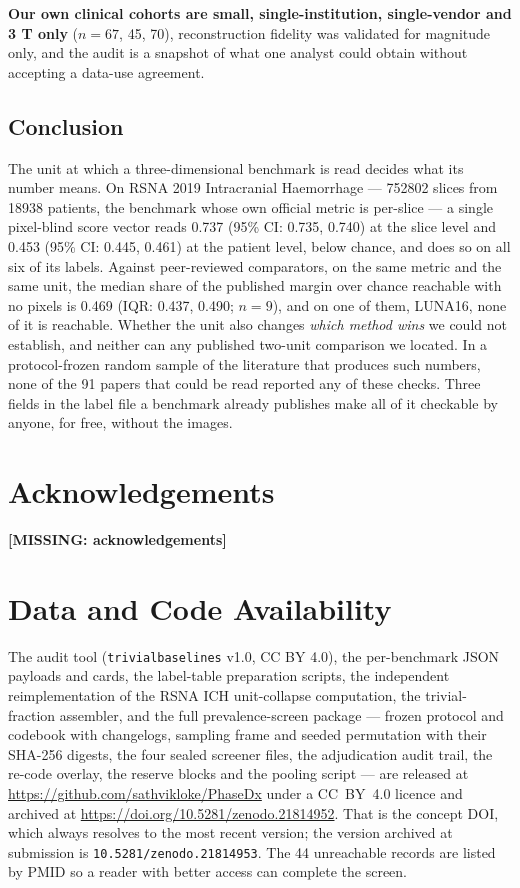 \documentclass[11pt,a4paper]{article}
\newcommand{\todo}[1]{\textbf{[#1]}}
\begin{document}
\textbf{Our own clinical cohorts are small, single-institution, single-vendor and
3 T only} ($n=67$, 45, 70), reconstruction fidelity was validated for magnitude
only, and the audit is a snapshot of what one analyst could obtain without
accepting a data-use agreement.

\subsection{Conclusion}

The unit at which a three-dimensional benchmark is read decides what its number
means. On RSNA 2019 Intracranial Haemorrhage --- \num{752802} slices from
\num{18938} patients, the benchmark whose own official metric is per-slice --- a
single pixel-blind score vector reads 0.737 (95\% CI: 0.735, 0.740) at the slice
level and 0.453 (95\% CI: 0.445, 0.461) at the patient level, below chance, and
does so on all six of its labels. Against peer-reviewed comparators, on the same
metric and the same unit, the median share of the published margin over chance
reachable with no pixels is 0.469 (IQR: 0.437, 0.490; $n=9$), and on one of them,
LUNA16, none of it is reachable. Whether the unit also changes \emph{which
method wins} we could not establish, and neither can any published two-unit
comparison we located. In a protocol-frozen random sample of the literature that
produces such numbers, none of the 91 papers that could be read reported any of
these checks. Three fields in the label file a benchmark already publishes make
all of it checkable by anyone, for free, without the images.

\section*{Acknowledgements}

\todo{MISSING: acknowledgements}

\section*{Data and Code Availability}

The audit tool (\texttt{trivialbaselines} v1.0, CC BY 4.0), the per-benchmark
JSON payloads and cards, the label-table preparation scripts, the independent
reimplementation of the RSNA ICH unit-collapse computation, the trivial-fraction
assembler, and the full prevalence-screen package --- frozen protocol and codebook
with changelogs, sampling frame and seeded permutation with their SHA-256 digests,
the four sealed screener files, the adjudication audit trail, the re-code overlay,
the reserve blocks and the pooling script --- are released at
\url{https://github.com/sathvikloke/PhaseDx} under a CC~BY~4.0 licence and
archived at \url{https://doi.org/10.5281/zenodo.21814952}. That is the concept
DOI, which always resolves to the most recent version; the version archived at
submission is \texttt{10.5281/zenodo.21814953}. The 44 unreachable records are
listed by PMID so a reader with better access can complete the screen.
\end{document}
